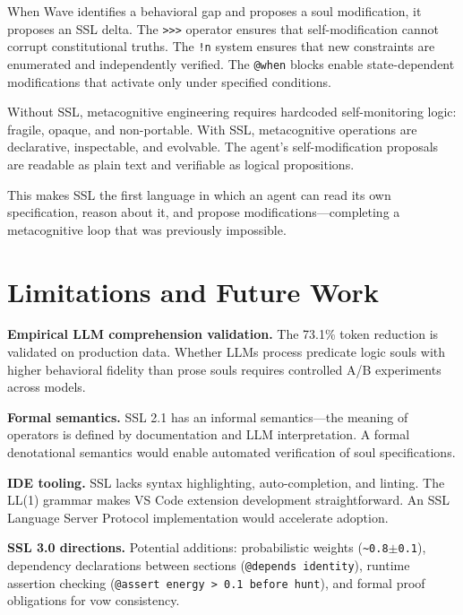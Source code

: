 \documentclass[12pt,a4paper]{article}
\theoremstyle{plain}
\theoremstyle{definition}
\theoremstyle{remark}
\begin{document}
When Wave identifies a behavioral gap and proposes a soul modification, it proposes an SSL delta. The \texttt{>>>} operator ensures that self-modification cannot corrupt constitutional truths. The \texttt{!n} system ensures that new constraints are enumerated and independently verified. The \texttt{@when} blocks enable state-dependent modifications that activate only under specified conditions.

Without SSL, metacognitive engineering requires hardcoded self-monitoring logic: fragile, opaque, and non-portable. With SSL, metacognitive operations are declarative, inspectable, and evolvable. The agent's self-modification proposals are readable as plain text and verifiable as logical propositions.

This makes SSL the first language in which an agent can read its own specification, reason about it, and propose modifications---completing a metacognitive loop that was previously impossible.

\section{Limitations and Future Work}

\textbf{Empirical LLM comprehension validation.} The 73.1\% token reduction is validated on production data. Whether LLMs process predicate logic souls with higher behavioral fidelity than prose souls requires controlled A/B experiments across models.

\textbf{Formal semantics.} SSL 2.1 has an informal semantics---the meaning of operators is defined by documentation and LLM interpretation. A formal denotational semantics would enable automated verification of soul specifications.

\textbf{IDE tooling.} SSL lacks syntax highlighting, auto-completion, and linting. The LL(1) grammar makes VS Code extension development straightforward. An SSL Language Server Protocol implementation would accelerate adoption.

\textbf{SSL 3.0 directions.} Potential additions: probabilistic weights (\texttt{\~{}0.8$\pm$0.1}), dependency declarations between sections (\texttt{@depends identity}), runtime assertion checking (\texttt{@assert energy > 0.1 before hunt}), and formal proof obligations for vow consistency.

\end{document}
